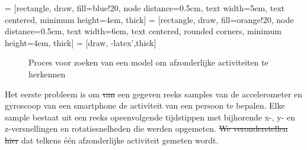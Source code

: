 \documentclass{article}
\providecommand{\DIFadd}[1]{{\protect\color{blue}\uwave{#1}}} %
\providecommand{\DIFdel}[1]{{\protect\color{red}\sout{#1}}}                      %
\providecommand{\DIFaddbegin}{} %
\providecommand{\DIFaddend}{} %
\providecommand{\DIFdelbegin}{} %
\providecommand{\DIFdelend}{} %
\begin{document}
 = [rectangle, draw, fill=blue!20, node distance=0.5cm, text width=5em, text centered, minimum height=4em, thick]
 = [rectangle, draw, fill=orange!20, node distance=0.5cm, text width=6em, text centered, rounded corners, minimum height=4em, thick]
 = [draw, -latex',thick]
\begin{figure}
\begin{center}
\end{center}
\caption{Proces voor zoeken van een model om afzonderlijke activiteiten te herkennen}
\label{fig:proces:afzonderlijk}
\end{figure}

Het eerste probleem is om \DIFdelbegin \DIFdel{van }\DIFdelend \DIFaddbegin \DIFadd{uit }\DIFaddend een gegeven reeks samples van de accelerometer en gyroscoop van een smartphone de activiteit van een persoon te bepalen. Elke sample bestaat uit een reeks opeenvolgende tijdstippen met bijhorende x-, y- en z-versnellingen en rotatiesnelheden die werden opgemeten. \DIFdelbegin \DIFdel{We veronderstellen hier }\DIFdelend \DIFaddbegin \DIFadd{Er wordt hier verondersteld }\DIFaddend dat telkens \'e\'en afzonderlijke activiteit gemeten wordt.
\end{document}
